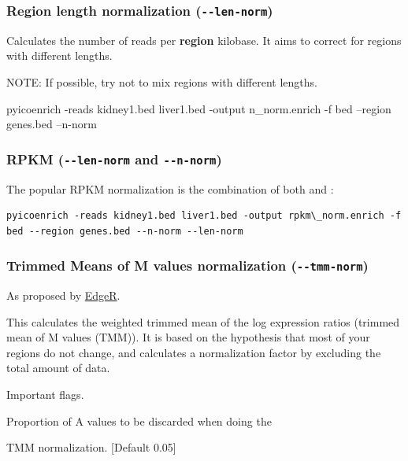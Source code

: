 \documentclass[letterpaper,10pt,english]{sphinxmanual}
\begin{document}
\subsubsection{Region length normalization (\texttt{-{-}len-norm})}
\label{pyicoenrich:region-length-normalization-len-norm}
Calculates the number of reads per \textbf{region} kilobase. It aims to correct for regions with different lengths.

NOTE: If possible, try not to mix regions with different lengths.

pyicoenrich -reads kidney1.bed liver1.bed -output n\_norm.enrich -f bed --region genes.bed --n-norm


\subsubsection{RPKM (\texttt{-{-}len-norm} and \texttt{-{-}n-norm})}
\label{pyicoenrich:rpkm-len-norm-and-n-norm}
The popular RPKM normalization is the combination of both  and :

\begin{Verbatim}[commandchars=\\\{\}]
pyicoenrich -reads kidney1.bed liver1.bed -output rpkm\_norm.enrich -f bed --region genes.bed --n-norm --len-norm
\end{Verbatim}


\subsubsection{Trimmed Means of M values normalization (\texttt{-{-}tmm-norm})}
\label{pyicoenrich:trimmed-means-of-m-values-normalization-tmm-norm}
As proposed by \href{http://genomebiology.com/2010/11/3/R25}{EdgeR}.

This calculates the weighted trimmed mean of the log expression ratios (trimmed mean of M values (TMM)). It is based on the hypothesis that most of your regions do not change, and calculates a normalization factor by excluding the total amount of data.

Important flags.

\begin{fulllineitems}
\label{pyicoenrich:cmdoption--a-trim}
Proportion of A values to be discarded when doing the

TMM normalization. {[}Default 0.05{]}

\end{fulllineitems}
\end{document}
